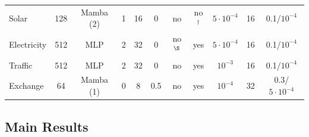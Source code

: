 \documentclass[review,12pt]{elsarticle}
\begin{document}
\begin{table}[tb]
\begin{tabular}{@{}lcccccccccc@{}}
Solar & 128 & Mamba (2) & 1 & 16 & 0 & no & no$^{\dagger}$ & $5{\cdot}10^{-4}$ & 16 & 0.1/$10^{-4}$ \\
Electricity & 512 & MLP & 2 & 32 & 0 & no$^{\S}$ & yes & $5{\cdot}10^{-4}$ & 16 & 0.1/$10^{-4}$ \\
Traffic & 512 & MLP & 2 & 32 & 0 & no & yes & $10^{-3}$ & 16 & 0.1/$10^{-4}$ \\
Exchange & 64 & Mamba (1) & 0 & 8 & 0.5 & no & yes & $10^{-4}$ & 32 & 0.3/$5{\cdot}10^{-4}$ \\
\bottomrule
\end{tabular}
\end{table}

\FloatBarrier
\subsection{Main Results}
\end{document}
